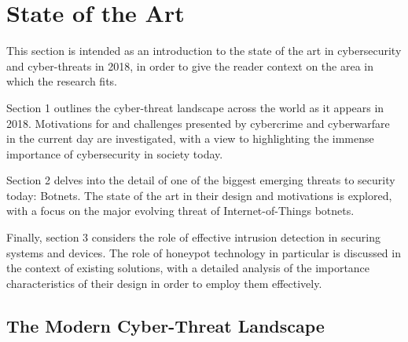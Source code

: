 \chapter{State of the Art}

This section is intended as an introduction to the state of the art in cybersecurity and cyber-threats in 2018, in order to give the reader context on the area in which the research fits.

Section 1 outlines the cyber-threat landscape across the world as it appears in 2018. Motivations for and challenges presented by cybercrime and cyberwarfare in the current day are investigated, with a view to highlighting the immense importance of cybersecurity in society today.

Section 2 delves into the detail of one of the biggest emerging threats to security today: Botnets. The state of the art in their design and motivations is explored, with a focus on the major evolving threat of Internet-of-Things botnets.

Finally, section 3 considers the role of effective intrusion detection in securing systems and devices. The role of honeypot technology in particular is discussed in the context of existing solutions, with a detailed analysis of the importance characteristics of their design in order to employ them effectively.



\section{The Modern Cyber-Threat Landscape}


